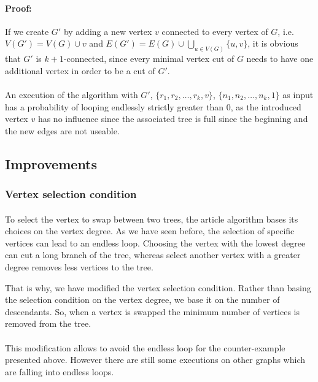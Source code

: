 \paragraph{Proof:}
If we create $G'$ by adding a new vertex $v$ connected to every vertex of $G$,
i.e. $V(G') = V(G) \cup v$ and
$E(G') = E(G) \cup \bigcup \limits_{u \in V(G)} \{u,v\}$, it is obvious that
$G'$ is $k+1$-connected, since every minimal vertex cut of $G$ needs to have
one additional vertex in order to be a cut of $G'$.

\paragraph{}
An execution of the algorithm with $G'$, $\{r_1,r_2, \dots, r_k, v\}$,
$\{n_1,n_2, \dots, n_k, 1\}$ as input has a probability of looping
endlessly strictly greater than $0$, as the introduced vertex $v$ has no
influence
since the associated tree is full since the beginning and the new edges
are not useable.
\subsection{Improvements}
\subsubsection{Vertex selection condition}
\paragraph{}
To select the vertex to swap between two trees, the article algorithm bases its 
choices on the vertex degree. As we have seen before, the selection of specific
vertices can lead to an endless loop. Choosing the vertex with the lowest degree
can cut a long branch of the tree, whereas select another vertex with a greater
degree removes less vertices to the tree.

That is why, we have modified the vertex selection condition. Rather than basing
the selection condition on the vertex degree, we base it on the number of 
descendants. So, when a vertex is swapped the minimum number of vertices is
removed from the tree.

\paragraph{}
This modification allows to avoid the endless loop for the counter-example
presented above. However there are still some executions on other graphs which
are falling into endless loops.

